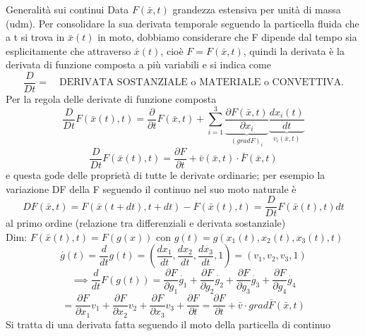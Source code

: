 \documentclass[a4paper,11pt]{report}
\newcommand{\x}{\bar{x}}
\newcommand{\xt}{\bar{x}(t)}
\newcommand{\vel}{\bar{v}}
\begin{document}
\begin{chapter}{Generalità sui continui}
		Data $F(\x,t)$ grandezza estensiva per unità di massa (udm). Per consolidare la sua derivata temporale seguendo la particella fluida che a t si trova in $\x(t)$ in moto, dobbiamo considerare che F dipende dal tempo sia esplicitamente che attraverso $\x(t)$, cioè $F=F(\x,t)$, quindi la derivata è la derivata di funzione composta a più variabili e si indica come 
		$$
		\dfrac{D}{Dt} =\quad \textrm{DERIVATA SOSTANZIALE o MATERIALE o CONVETTIVA}.
		$$
		Per la regola delle derivate di funzione composta
		$$
		\dfrac{D}{Dt} F(\xt,t) = \dfrac{\partial}{\partial t}F(\x,t) + \sum_{i=1}^{3} \underset{(grad F)_i}{\underbrace{\dfrac{\partial F(\x,t)}{\partial x_i}}} \underset{v_i(\x,t)}{\underbrace{\dfrac{dx_i(t)}{dt}}}
		$$
		\begin{equation}
			\dfrac{D}{Dt} F(\xt,t) = \dfrac{\partial F}{\partial t} + \bar{v}(\x,t) \cdot \bar{F}(\x,t)
		\end{equation}
		e questa gode delle proprietà di tutte le derivate ordinarie; per esempio la variazione DF della F seguendo il continuo nel suo moto naturale è
		\begin{equation}
			DF(\x,t) = F(\x(t+dt),t+dt) - F(\xt,t) = \dfrac{D}{Dt} F(\xt,t) dt
		\end{equation}
		al primo ordine (relazione tra differenziali e derivata sostanziale)\\
		Dim: $F(\xt,t) = F(g(x))$ con $g(t) = g(x_1(t),x_2(t),x_3(t),t)$
		$$
		\overset{\cdot}{g}(t) = \dfrac{d}{dt} g(t) = \left(\dfrac{dx_1}{dt},\dfrac{dx_2}{dt},\dfrac{dx_3}{dt},1\right) = (v_1,v_2,v_3,1)
		$$
		$$
		\implies \dfrac{d}{dt}F(g(t)) = \dfrac{\partial F}{\partial g_1}\overset{\cdot}{g}_1 + \dfrac{\partial F}{\partial g_2}\overset{\cdot}{g}_2 + \dfrac{\partial F}{\partial g_3}\overset{\cdot}{g}_3 + \dfrac{\partial F}{\partial g_4}\overset{\cdot}{g}_4 
		$$
		$$
		 = \dfrac{\partial F}{\partial x_1}v_1 + \dfrac{\partial F}{\partial x_2}v_2 + \dfrac{\partial F}{\partial x_3}v_3 + \dfrac{\partial F}{\partial t} = \dfrac{\partial F}{\partial t} + \vel \cdot grad \bar{F}(\x,t)
		$$
		Si tratta di una derivata fatta seguendo il moto della particella di continuo
		
	\end{chapter}
\end{document}
